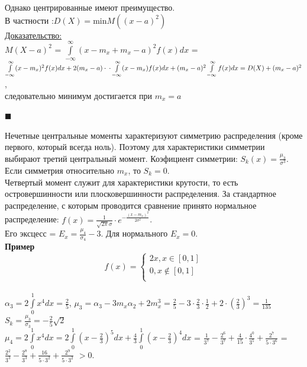\documentclass[russian, 12pt, fleqn]{article}
\begin{document}
Однако центрированные имеют преимущество.
\\В  частности :$D(X) = $min$ M((x-a)^2)$\\
\underline{Доказательство:}\\
$M(X-a)^2$ = $\int\limits_{-\infty}^{\infty}(x-m_x+m_x-a)^2f(x)dx$ = $\int\limits_{-\infty}^{\infty}(x-m_x)^2f(x)dx + 2(m_x-a)\cdot \\
 \cdot \int\limits_{-\infty}^{\infty}(x-m_x)f(x)dx + (m_x - a)^2 \int\limits_{-\infty}^{\infty} f(x)dx = D(X) + (m_x-a)^2$,\\ следовательно минимум достигается при $m_x=a$
\begin{flushright}\(\blacksquare\)\end{flushright}
Нечетные центральные моменты характеризуют симметрию распределения (кроме первого, который всегда ноль). Поэтому для характеристики симметрии выбирают третий центральный  момент.
Коэфициент симметрии: $S_k(x) = \frac{\mu_3}{\sigma^3}$.\\
Если симметрия относительно $m_x$, то $S_k = 0$.\\
Четвертый момент служит для характеристики крутости, то есть островершинности или плосковершинности распределения. За стандартное\\ распределение,  с которым проводится сравнение принято нормальное распределение: $f(x) = \frac{1}{\sqrt{2\pi}\sigma}\cdot e^{-\frac{(x-m_x)^2}{2\sigma^2}}$. \\
Его эксцесс = $E_x = \frac{\mu_4}{\sigma_4} - 3$. Для нормального $E_x = 0$.\\
\textbf{Пример\ }\\
\begin{equation*} 
f(x)=
 \begin{cases}
   2x,  x \in [0, 1]\\
   0 , x \notin [0, 1]\\
 \end{cases}
\end{equation*}\\
$\alpha_3 = 2\int\limits_{0}^{1}x^4dx=\frac{2}{5}$, $\mu_3 = \alpha_3 - 3m_x\alpha_2 + 2m_x^3 = \frac{2}{5} - 3\cdot\frac{2}{3}\cdot\frac{1}{2} + 2 \cdot (\frac{2}{3})^3 = \frac{1}{135}$\\
$S_k = \frac{\mu_3}{\sigma_3} = -\frac{2}{5}\sqrt2$\\
$\mu_4 = 2\int\limits_0^1x^4dx=2\int\limits_0 ^1(x-\frac{2}{3})^5dx + \frac{4}{3}\int\limits_{0}^{1}(x-\frac{2}{3})^4dx$ = $\frac{1}{3^7} - \frac{2^6}{3^7} + \frac{4}{15} \cdot \frac{4^0}{3^5} + \frac{2^7}{5\cdot3^6}$ = $\frac{2^2}{3^3} - \frac{2^8}{3^3} + \frac{16}{5\cdot3^2} + \frac{2^9}{5\cdot3^2}$ $>0$.\\
\end{document}
